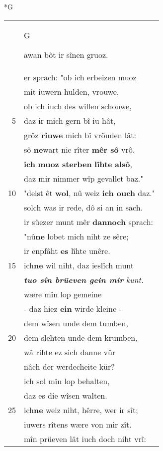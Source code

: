 \documentclass[8pt,a4paper,notitlepage]{article}
\begin{document}
\begin{table}[ht]
\begin{minipage}[t]{0.5\linewidth}
\small
\begin{center}*G
\end{center}
\begin{tabular}{rl}
 & \begin{large}G\end{large}awan bôt ir sînen gruoz.\\ 
 & er sprach: "ob ich erbeizen muoz\\ 
 & mit iuwern hulden, vrouwe,\\ 
 & ob ich iuch des willen schouwe,\\ 
5 & daz ir mich gern bî iu hât,\\ 
 & grôz \textbf{riuwe} mich bî vröuden lât:\\ 
 & sô \textbf{ne}wart nie rîter \textbf{mêr sô} vrô.\\ 
 & \textbf{ich} \textbf{muoz sterben} \textbf{lîhte} \textbf{alsô},\\ 
 & daz mir nimmer wîp gevallet baz."\\ 
10 & "deist êt \textbf{wol}, nû weiz \textbf{ich ouch} daz."\\ 
 & solch was ir rede, dô si an in sach.\\ 
 & ir süezer munt mêr \textbf{dannoch} sprach:\\ 
 & "nû\textbf{ne} lobet mich niht ze sêre;\\ 
 & ir enpfâht \textbf{es} lîhte unêre.\\ 
15 & ich\textbf{ne} wil niht, daz ieslîch munt\\ 
 & \textit{\textbf{tuo sîn brüeven gein mir}} \textit{kunt.}\\ 
 & wære mîn lop gemeine\\ 
 & - daz hiez \textbf{ein} wirde kleine -\\ 
 & dem wîsen unde dem tumben,\\ 
20 & dem slehten unde dem krumben,\\ 
 & wâ rihte ez sich danne vür\\ 
 & nâch der werdecheite kür?\\ 
 & ich sol mîn lop behalten,\\ 
 & daz es die wîsen walten.\\ 
25 & ich\textbf{ne} weiz niht, hêrre, wer ir sît;\\ 
 & iuwers rîtens wære von mir zît.\\ 
 & mîn prüeven lât iuch doch niht vrî:\\ 

\end{tabular}
\end{minipage}
\end{table}
\end{document}
